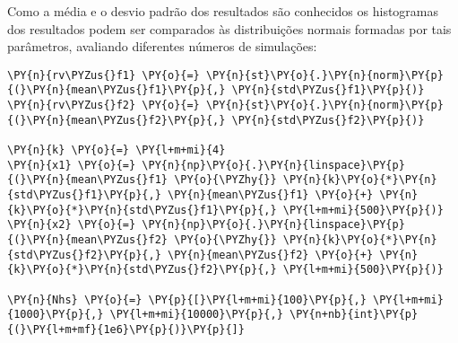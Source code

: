     Como a média e o desvio padrão dos resultados são conhecidos os
histogramas dos resultados podem ser comparados às distribuições normais
formadas por tais parâmetros, avaliando diferentes números de
simulações:

    \begin{tcolorbox}[breakable, size=fbox, boxrule=1pt, pad at break*=1mm,colback=cellbackground, colframe=cellborder]
\begin{Verbatim}[commandchars=\\\{\}]
\PY{n}{rv\PYZus{}f1} \PY{o}{=} \PY{n}{st}\PY{o}{.}\PY{n}{norm}\PY{p}{(}\PY{n}{mean\PYZus{}f1}\PY{p}{,} \PY{n}{std\PYZus{}f1}\PY{p}{)}
\PY{n}{rv\PYZus{}f2} \PY{o}{=} \PY{n}{st}\PY{o}{.}\PY{n}{norm}\PY{p}{(}\PY{n}{mean\PYZus{}f2}\PY{p}{,} \PY{n}{std\PYZus{}f2}\PY{p}{)}

\PY{n}{k} \PY{o}{=} \PY{l+m+mi}{4}
\PY{n}{x1} \PY{o}{=} \PY{n}{np}\PY{o}{.}\PY{n}{linspace}\PY{p}{(}\PY{n}{mean\PYZus{}f1} \PY{o}{\PYZhy{}} \PY{n}{k}\PY{o}{*}\PY{n}{std\PYZus{}f1}\PY{p}{,} \PY{n}{mean\PYZus{}f1} \PY{o}{+} \PY{n}{k}\PY{o}{*}\PY{n}{std\PYZus{}f1}\PY{p}{,} \PY{l+m+mi}{500}\PY{p}{)}
\PY{n}{x2} \PY{o}{=} \PY{n}{np}\PY{o}{.}\PY{n}{linspace}\PY{p}{(}\PY{n}{mean\PYZus{}f2} \PY{o}{\PYZhy{}} \PY{n}{k}\PY{o}{*}\PY{n}{std\PYZus{}f2}\PY{p}{,} \PY{n}{mean\PYZus{}f2} \PY{o}{+} \PY{n}{k}\PY{o}{*}\PY{n}{std\PYZus{}f2}\PY{p}{,} \PY{l+m+mi}{500}\PY{p}{)}

\PY{n}{Nhs} \PY{o}{=} \PY{p}{[}\PY{l+m+mi}{100}\PY{p}{,} \PY{l+m+mi}{1000}\PY{p}{,} \PY{l+m+mi}{10000}\PY{p}{,} \PY{n+nb}{int}\PY{p}{(}\PY{l+m+mf}{1e6}\PY{p}{)}\PY{p}{]}


\end{Verbatim}
\end{tcolorbox}
